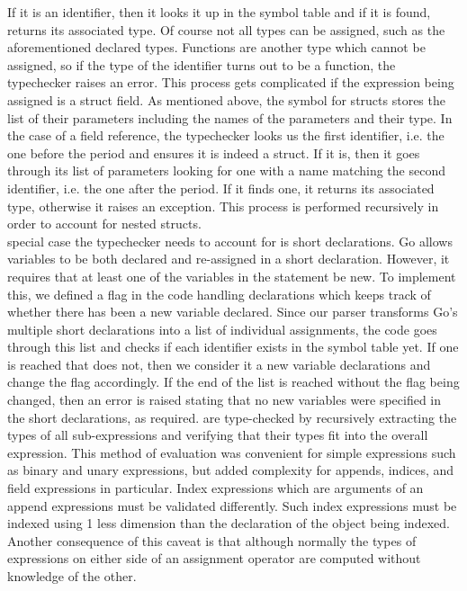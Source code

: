 \documentclass{article}
\begin{document}
If it is an identifier, then it looks it up in the symbol table and if it is found, returns its associated type.
Of course not all types can be assigned, such as the aforementioned declared types.
Functions are another type which cannot be assigned, so if the type of the identifier turns out to be a function, the typechecker raises an error.
This process gets complicated if the expression being assigned is a struct field.
As mentioned above, the symbol for structs stores the list of their parameters including the names of the parameters and their type.
In the case of a field reference, the typechecker looks us the first identifier, i.e. the one before the period and ensures it is indeed a struct.
If it is, then it goes through its list of parameters looking for one with a name matching the second identifier, i.e. the one after the period. If it finds one, it returns its associated type, otherwise it raises an exception.
This process is performed recursively in order to account for nested structs.\\
 special case the typechecker needs to account for is short declarations.
Go allows variables to be both declared and re-assigned in a short declaration.
However, it requires that at least one of the variables in the statement be new.
To implement this, we defined a flag in the code handling declarations which keeps track of whether there has been a new variable declared.
Since our parser transforms Go's multiple short declarations into a list of individual assignments, the code goes through this list and checks if each identifier exists in the symbol table yet.
If one is reached that does not, then we consider it a new variable declarations and change the flag accordingly.
If the end of the list is reached without the flag being changed, then an error is raised stating that no new variables were specified in the short declarations, as required.
 are type-checked by recursively extracting the types of all sub-expressions and verifying that their types fit into the overall expression.
This method of evaluation was convenient for simple expressions such as binary and unary expressions, but added complexity for appends, indices, and field expressions in particular.
Index expressions which are arguments of an append expressions must be validated differently.
Such index expressions must be indexed using 1 less dimension than the declaration of the object being indexed.
Another consequence of this caveat is that although normally the types of expressions on either side of an assignment operator are computed without knowledge of the other.
\end{document}
